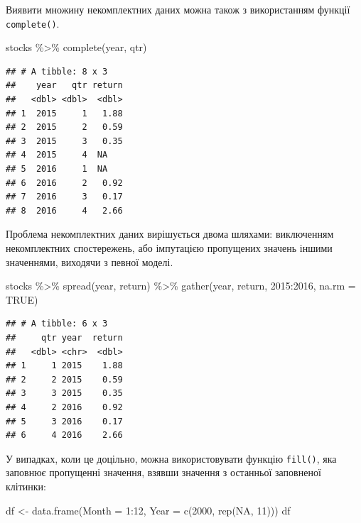 \documentclass[
]{book}
\newenvironment{Shaded}{\begin{snugshade}}{\end{snugshade}}
\newcommand{\AttributeTok}[1]{\textcolor[rgb]{0.77,0.63,0.00}{#1}}
\newcommand{\ConstantTok}[1]{\textcolor[rgb]{0.00,0.00,0.00}{#1}}
\newcommand{\DecValTok}[1]{\textcolor[rgb]{0.00,0.00,0.81}{#1}}
\newcommand{\FunctionTok}[1]{\textcolor[rgb]{0.00,0.00,0.00}{#1}}
\newcommand{\NormalTok}[1]{#1}
\newcommand{\OtherTok}[1]{\textcolor[rgb]{0.56,0.35,0.01}{#1}}
\newcommand{\SpecialCharTok}[1]{\textcolor[rgb]{0.00,0.00,0.00}{#1}}
\newcommand{\StringTok}[1]{\textcolor[rgb]{0.31,0.60,0.02}{#1}}
\begin{document}
Виявити множину некомплектних даних можна також з використанням функції \texttt{complete()}.

\begin{Shaded}
\begin{Highlighting}[]
\NormalTok{stocks }\SpecialCharTok{\%\textgreater{}\%} 
  \FunctionTok{complete}\NormalTok{(year, qtr)}
\end{Highlighting}
\end{Shaded}

\begin{verbatim}
## # A tibble: 8 x 3
##    year   qtr return
##   <dbl> <dbl>  <dbl>
## 1  2015     1   1.88
## 2  2015     2   0.59
## 3  2015     3   0.35
## 4  2015     4  NA   
## 5  2016     1  NA   
## 6  2016     2   0.92
## 7  2016     3   0.17
## 8  2016     4   2.66
\end{verbatim}

Проблема некомплектних даних вирішується двома шляхами: виключенням некомплектних спостережень, або імпутацією пропущених значень іншими значеннями, виходячи з певної моделі.

\begin{Shaded}
\begin{Highlighting}[]
\NormalTok{stocks }\SpecialCharTok{\%\textgreater{}\%} 
  \FunctionTok{spread}\NormalTok{(year, return) }\SpecialCharTok{\%\textgreater{}\%} 
  \FunctionTok{gather}\NormalTok{(year, return, }\StringTok{\textasciigrave{}}\AttributeTok{2015}\StringTok{\textasciigrave{}}\SpecialCharTok{:}\StringTok{\textasciigrave{}}\AttributeTok{2016}\StringTok{\textasciigrave{}}\NormalTok{, }\AttributeTok{na.rm =} \ConstantTok{TRUE}\NormalTok{)}
\end{Highlighting}
\end{Shaded}

\begin{verbatim}
## # A tibble: 6 x 3
##     qtr year  return
##   <dbl> <chr>  <dbl>
## 1     1 2015    1.88
## 2     2 2015    0.59
## 3     3 2015    0.35
## 4     2 2016    0.92
## 5     3 2016    0.17
## 6     4 2016    2.66
\end{verbatim}

У випадках, коли це доцільно, можна використовувати функцію \texttt{fill()}, яка заповнює пропущенні значення, взявши значення з останньої заповненої клітинки:

\begin{Shaded}
\begin{Highlighting}[]
\NormalTok{df }\OtherTok{\textless{}{-}} \FunctionTok{data.frame}\NormalTok{(}\AttributeTok{Month =} \DecValTok{1}\SpecialCharTok{:}\DecValTok{12}\NormalTok{, }\AttributeTok{Year =} \FunctionTok{c}\NormalTok{(}\DecValTok{2000}\NormalTok{, }\FunctionTok{rep}\NormalTok{(}\ConstantTok{NA}\NormalTok{, }\DecValTok{11}\NormalTok{)))}
\NormalTok{df}
\end{Highlighting}
\end{Shaded}
\end{document}

